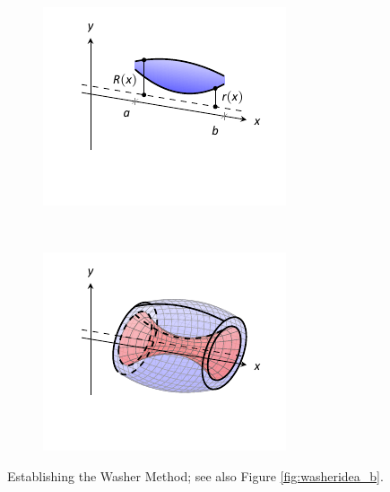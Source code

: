 \begin{figure}[H]
	\centering
	\begin{subfigure}[t]{0.5\textwidth}
		\includegraphics[width=\textwidth]{figures/figwasher_idea_a}
		\caption{} 
	\end{subfigure}%
	~ 
	\begin{subfigure}[t]{0.5\textwidth}    
		\includegraphics[width=\textwidth]{figures/figwasher_idea_b}
		\caption{}    
	\end{subfigure} 
	\caption{Establishing the Washer Method; see also Figure \ref{fig:washeridea_b}. \label{fig:washeridea}}
\end{figure}	




